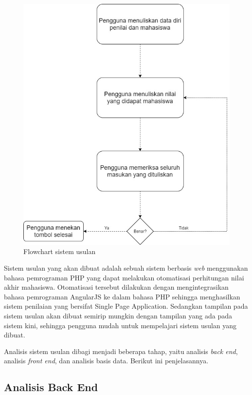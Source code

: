 \begin{figure}[H]
	\centering
	\includegraphics[scale=0.43]{Gambar/flowchart}
	\caption{Flowchart sistem usulan}
	\label{fig:flowchart}
\end{figure}

Sistem usulan yang akan dibuat adalah sebuah sistem berbasis \textit{web} menggunakan bahasa pemrograman PHP yang dapat melakukan otomatisasi perhitungan nilai akhir mahasiswa. Otomatisasi tersebut dilakukan dengan mengintegrasikan bahasa pemrograman AngularJS ke dalam bahasa PHP sehingga menghasilkan sistem penilaian yang bersifat Single Page Application. Sedangkan tampilan pada sistem usulan akan dibuat semirip mungkin dengan tampilan yang ada pada sistem kini, sehingga pengguna mudah untuk mempelajari sistem usulan yang dibuat.

Analisis sistem usulan dibagi menjadi beberapa tahap, yaitu analisis \textit{back end}, analisis \textit{front end}, dan analisis basis data. Berikut ini penjelasannya.
	
	\subsection{Analisis Back End}
	\label{sub: backEnd}
	
